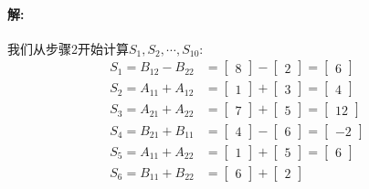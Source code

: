 \documentclass[a4paper,11pt]{article}
\begin{document}
\paragraph{解:}我们从步骤2开始计算$S_1,S_2,\cdots,S_{10}$:
\begin{align*}
	S_1 = B_{12}-B_{22} &=
	\begin{bmatrix}
	8
	\end{bmatrix}
	-
	\begin{bmatrix}
	2
	\end{bmatrix}
	=
	\begin{bmatrix}
	6
	\end{bmatrix}\\
	S_2 = A_{11}+A_{12} &=
	\begin{bmatrix}
	1
	\end{bmatrix}
	+
	\begin{bmatrix}
	3
	\end{bmatrix}
	=
	\begin{bmatrix}
	4
	\end{bmatrix} \\
	S_3 = A_{21}+A_{22} &=
	\begin{bmatrix}
	7
	\end{bmatrix}
	+
	\begin{bmatrix}
	5
	\end{bmatrix}
	=
	\begin{bmatrix}
	12
	\end{bmatrix} \\	
	S_4 = B_{21}+B_{11} &=
	\begin{bmatrix}
	4
	\end{bmatrix}
	-
	\begin{bmatrix}
	6
	\end{bmatrix}
	=
	\begin{bmatrix}
	-2
	\end{bmatrix} \\	
	S_5 = A_{11}+A_{22} &=
	\begin{bmatrix}
	1
	\end{bmatrix}
	+
	\begin{bmatrix}
	5
	\end{bmatrix}
	=
	\begin{bmatrix}
	6
	\end{bmatrix} \\	
	S_6 = B_{11}+B_{22} &=
	\begin{bmatrix}
	6
	\end{bmatrix}
	+
	\begin{bmatrix}
	2
	\end{bmatrix}

\end{align*}
\end{document}
